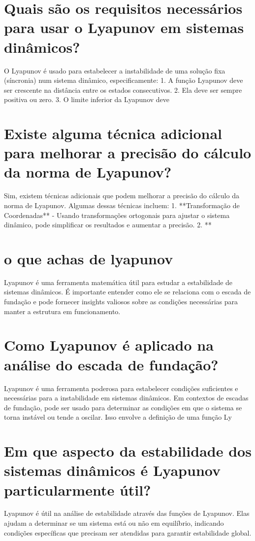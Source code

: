 \documentclass[11pt,a4paper]{article}
\begin{document}
\section{Quais são os requisitos necessários para usar o Lyapunov em sistemas dinâmicos?}
O Lyapunov é usado para estabelecer a instabilidade de uma solução fixa (síncronia) num sistema dinâmico, especificamente: 1. A função Lyapunov deve ser crescente na distância entre os estados consecutivos. 2. Ela deve ser sempre positiva ou zero. 3. O limite inferior da Lyapunov deve

\section{Existe alguma técnica adicional para melhorar a precisão do cálculo da norma de Lyapunov?}
Sim, existem técnicas adicionais que podem melhorar a precisão do cálculo da norma de Lyapunov. Algumas dessas técnicas incluem: 1. **Transformação de Coordenadas** - Usando transformações ortogonais para ajustar o sistema dinâmico, pode simplificar os resultados e aumentar a precisão. 2. **

\section{o que achas de lyapunov}
Lyapunov é uma ferramenta matemática útil para estudar a estabilidade de sistemas dinâmicos. É importante entender como ele se relaciona com o escada de fundação e pode fornecer insights valiosos sobre as condições necessárias para manter a estrutura em funcionamento.

\section{Como Lyapunov é aplicado na análise do escada de fundação?}
Lyapunov é uma ferramenta poderosa para estabelecer condições suficientes e necessárias para a instabilidade em sistemas dinâmicos. Em contextos de escadas de fundação, pode ser usado para determinar as condições em que o sistema se torna instável ou tende a oscilar. Isso envolve a definição de uma função Ly

\section{Em que aspecto da estabilidade dos sistemas dinâmicos é Lyapunov particularmente útil?}
Lyapunov é útil na análise de estabilidade através das funções de Lyapunov. Elas ajudam a determinar se um sistema está ou não em equilíbrio, indicando condições específicas que precisam ser atendidas para garantir estabilidade global.
\end{document}
